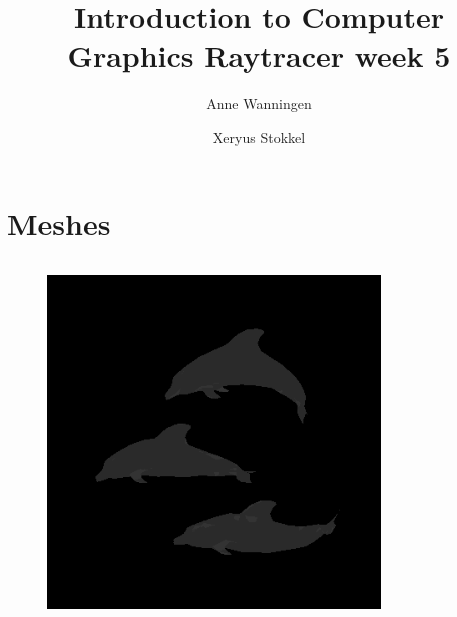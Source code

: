 \documentclass{beamer}
\author{Anne Wanningen \and Xeryus Stokkel}
\title[Week 4]{Introduction to Computer Graphics Raytracer week 5}
\begin{document}
\maketitle

\section{Meshes}

\begin{frame}
	\begin{columns}[T]
		\begin{column}{.45\textwidth}
			\begin{figure}
				\includegraphics[width=\textwidth]{dolphins-incorrect}
			\end{figure}
		\end{column}
		\begin{column}{.45\textwidth}
			\begin{figure}

\end{figure}
\end{column}
\end{columns}
\end{frame}
\end{document}
